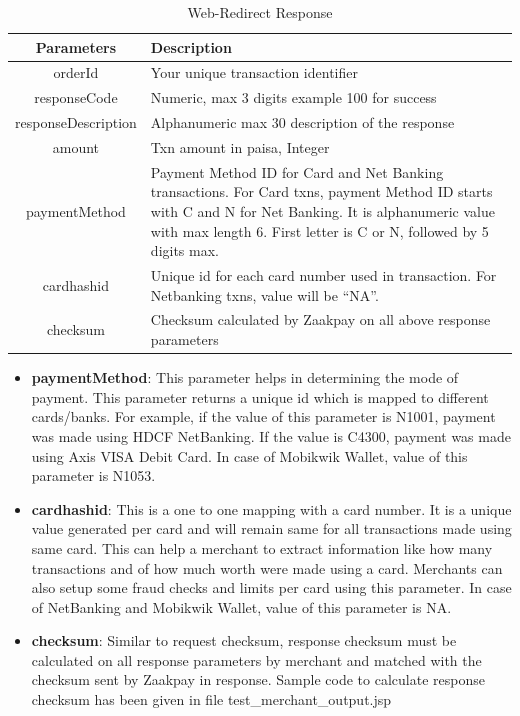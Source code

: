 \documentclass{article}
\begin{document}
\begin{longtable}{||c|p{12.5cm}||}
      \caption{Web-Redirect Response}\\
   \rowcolor{green!50}
\bfseries{Parameters} & \bfseries{Description} \\ \hline
orderId & Your unique transaction identifier \\
responseCode & Numeric, max 3 digits example 100 for success\\
responseDescription & Alphanumeric max 30 description of the response\\
amount & Txn amount in paisa, Integer \\
paymentMethod & Payment Method ID for Card and Net Banking transactions. For Card txns, payment Method ID starts with C and N for Net Banking. It is alphanumeric value with max length 6. First letter is C or N, followed by 5 digits max.\\
cardhashid & Unique id for each card number used in transaction. For Netbanking txns, value will be “NA”.\\
checksum & Checksum calculated by Zaakpay on all above response
parameters\\
\end{longtable}
\begin{itemize}
\item {\bfseries paymentMethod}: This parameter helps in determining the mode of payment. This parameter returns a unique id which is mapped to different cards/banks. For example, if the value of this parameter is N1001, payment was made using HDCF NetBanking. If the value is C4300, payment was made using Axis VISA Debit Card.
In case of Mobikwik Wallet, value of this parameter is N1053.
\item {\bfseries cardhashid}: This is a one to one mapping with a card number. It is a unique value generated per card and will remain same for all transactions made using same card. This can help a merchant to extract information like how many transactions and of how much worth were made using a card.  Merchants can also setup some fraud checks and limits per  card using this parameter. In case of NetBanking and Mobikwik Wallet, value of this parameter is NA. 
\item {\bfseries checksum}: Similar to request checksum, response checksum must be calculated on all response parameters by merchant and matched with the checksum sent by Zaakpay in response. Sample code to calculate response checksum has been given in file test\_merchant\_output.jsp
\end{itemize}
\end{document}
